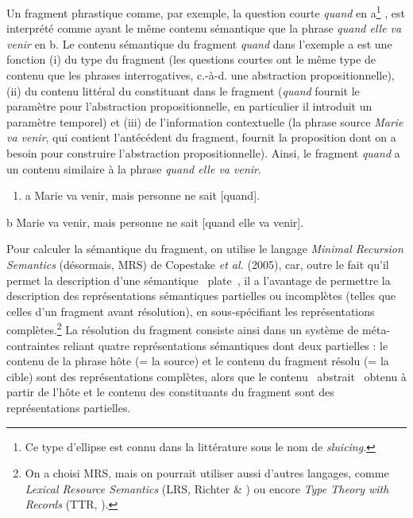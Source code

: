 Un fragment phrastique comme, par exemple, la question courte \textit{quand} en a\footnote{Ce type d'ellipse est connu dans la littérature sous le nom de \textit{sluicing}.} , est interprété comme ayant le même contenu sémantique que la phrase \textit{quand elle va venir} en b. Le contenu sémantique du fragment \textit{quand} dans l'exemple a est une fonction (i) du type du fragment (les questions courtes ont le même type de contenu que les phrases interrogatives, c.-à-d. une abstraction propositionnelle), (ii) du contenu littéral du constituant dans le fragment (\textit{quand} fournit le paramètre pour l'abstraction propositionnelle, en particulier il introduit un paramètre temporel) et (iii) de l'information contextuelle (la phrase source \textit{Marie va venir}, qui contient l'antécédent du fragment, fournit la proposition dont on a besoin pour construire l'abstraction propositionnelle). Ainsi, le fragment \textit{quand} a un contenu similaire à la phrase \textit{quand elle va venir}.  


\begin{enumerate}
\item \label{bkm:Ref295832479}a  Marie va venir, mais personne ne sait [quand]. 


\end{enumerate}
  b  Marie va venir, mais personne ne sait [quand elle va venir].

Pour calculer la sémantique du fragment, on utilise le langage \textit{Minimal Recursion Semantics} (désormais, MRS) de Copestake \textit{et al.} (2005), car, outre le fait qu'il permet la description d'une sémantique {\guillemotleft}~plate~{\guillemotright}, il a l'avantage de permettre la description des représentations sémantiques partielles ou incomplètes (telles que celles d'un fragment avant résolution), en sous-spécifiant les représentations complètes.\footnote{On a choisi MRS, mais on pourrait utiliser aussi d'autres langages, comme \textit{Lexical Resource Semantics} (LRS, Richter \& \citet{Sailer2003}) ou encore \textit{Type Theory with Records} (TTR, \citet{Cooper2005}).}  La résolution du fragment consiste ainsi dans un système de méta-contraintes reliant quatre représentations sémantiques dont deux partielles : le contenu de la phrase hôte (= la source) et le contenu du fragment résolu (= la cible) sont des représentations complètes, alors que le contenu {\guillemotleft}~abstrait~{\guillemotright} obtenu à partir de l'hôte et le contenu des constituants du fragment sont des représentations partielles.

